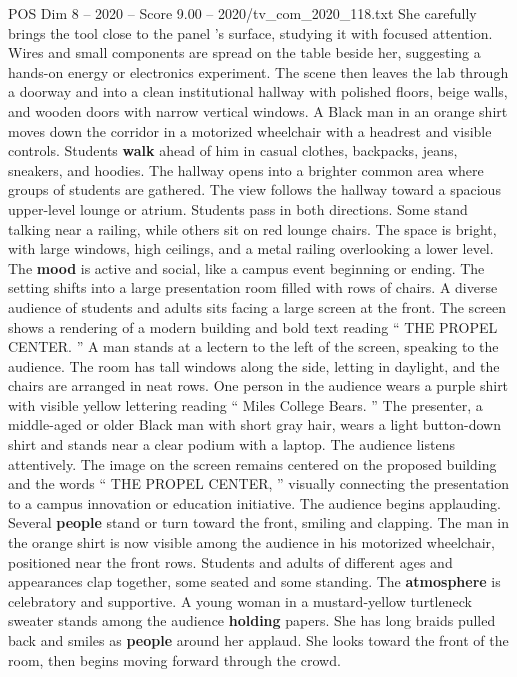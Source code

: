 \begin{textsample}{POS Dim 8 – 2020 – Score 9.00 – 2020/tv\_com\_2020\_118.txt}
She carefully brings the tool close to the panel ’s surface, studying it with focused attention.
Wires and small components are spread on the table beside her, suggesting a hands-on energy or electronics experiment.
The scene then leaves the lab through a doorway and into a clean institutional hallway with polished floors, beige walls, and wooden doors with narrow vertical windows.
A Black man in an orange shirt moves down the corridor in a motorized wheelchair with a headrest and visible controls.
Students \textbf{walk} ahead of him in casual clothes, backpacks, jeans, sneakers, and hoodies.
The hallway opens into a brighter common area where groups of students are gathered.
The view follows the hallway toward a spacious upper-level lounge or atrium.
Students pass in both directions.
Some stand talking near a railing, while others sit on red lounge chairs.
The space is bright, with large windows, high ceilings, and a metal railing overlooking a lower level.
The \textbf{mood} is active and social, like a campus event beginning or ending.
The setting shifts into a large presentation room filled with rows of chairs.
A diverse audience of students and adults sits facing a large screen at the front.
The screen shows a rendering of a modern building and bold text reading “ THE PROPEL CENTER. ” A man stands at a lectern to the left of the screen, speaking to the audience.
The room has tall windows along the side, letting in daylight, and the chairs are arranged in neat rows.
One person in the audience wears a purple shirt with visible yellow lettering reading “ Miles College Bears. ” The presenter, a middle-aged or older Black man with short gray hair, wears a light button-down shirt and stands near a clear podium with a laptop.
The audience listens attentively.
The image on the screen remains centered on the proposed building and the words “ THE PROPEL CENTER, ” visually connecting the presentation to a campus innovation or education initiative.
The audience begins applauding.
Several \textbf{people} stand or turn toward the front, smiling and clapping.
The man in the orange shirt is now visible among the audience in his motorized wheelchair, positioned near the front rows.
Students and adults of different ages and appearances clap together, some seated and some standing.
The \textbf{atmosphere} is celebratory and supportive.
A young woman in a mustard-yellow turtleneck sweater stands among the audience \textbf{holding} papers.
She has long braids pulled back and smiles as \textbf{people} around her applaud.
She looks toward the front of the room, then begins moving forward through the crowd.

\end{textsample}
